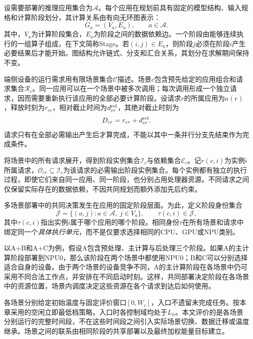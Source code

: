设需要部署的推理应用集合为$\mathcal A$。每个应用在规划前具有固定的模型结构、输入规格和计算阶段划分，其计算关系由有向无环图表示：
\begin{equation}
 G_a=(V_a,E_a),\qquad a\in\mathcal A.
 \label{eq:c3-app}
\end{equation}
其中，$V_a$为计算阶段集合，$E_a$为阶段之间的数据依赖边。一个阶段由能够连续执行的一组算子组成，在下文简称Stage。若$(i,j)\in E_a$，则阶段$j$必须在阶段$i$产生必要结果后才能开始。图结构允许链式、分支和汇合关系，其划分在求解期间保持不变。

端侧设备的运行需求用有限场景集合$\mathcal C$描述。场景$c$包含预先给定的应用组合和请求集合$\mathcal R_c$。同一应用可以在一个场景中被多次调用；每次调用形成一个独立请求，因而需要重新执行该应用的全部必要计算阶段。设请求$r$的所属应用为$a(r)$，释放时刻为$r_{cr}$，相对截止时间为$d^{\rm rel}_{cr}$，其绝对截止时刻为
\begin{equation}
 D_{cr}=r_{cr}+d^{\rm rel}_{cr}.
 \label{eq:c3-deadline}
\end{equation}
请求只有在全部必需输出产生后才算完成，不能以其中一条并行分支先结束作为完成条件。

将场景中的所有请求展开，得到阶段实例集合$\mathcal I_c$与依赖集合$\mathcal E_c$。记$r(c,i)$为实例$i$所属请求，$\mathcal O_{cr}\subseteq\mathcal I_c$为该请求的必需输出阶段实例集合。每个实例都有独立的执行过程，即使它们来自同一应用、同一阶段，也分别占用处理器资源。不同请求之间仅保留实际存在的数据依赖，不因共同规划而额外添加先后约束。

多场景部署中的共同决策发生在应用的固定阶段层面。为此，定义阶段身份集合
\begin{equation}
 \mathcal J=\{(a,j):a\in\mathcal A,\ j\in V_a\},\qquad
 \tau(c,i)\in\mathcal J,
 \label{eq:c3-stage-id}
\end{equation}
其中$\tau(c,i)$指出实例$i$属于哪个应用的哪个阶段。相同身份$\tau$在所有场景和请求中绑定同一个\emph{具体执行单元}，而不是仅要求选择相同的CPU、GPU或NPU类别。

以A+B和A+C为例，假设A包含预处理、主计算与后处理三个阶段。如果A的主计算阶段部署到NPU0，那么该阶段在两个场景中都使用NPU0；B和C可以分别选择适合自身的设备。由于两个场景的设备竞争不同，A的主计算阶段在各场景中仍可采用不同合法工作点，并安排在不同启动时刻。这样，共同部署决定阶段在各场景中的资源位置，场景内调度决定这些资源在各个请求到达后如何使用。

各场景分别给定初始温度与固定评价窗口$[0,W_c]$，入口不遗留未完成任务。按本章采用的空闲立即最低档策略，入口时各控制域均处于$L_h$。本文评价的是各场景分别运行的完整时间段，不在这些时间段之间引入实际场景切换、数据迁移或温度继承。场景之间的联系由相同阶段的共享部署以及最终加权能量目标建立。

